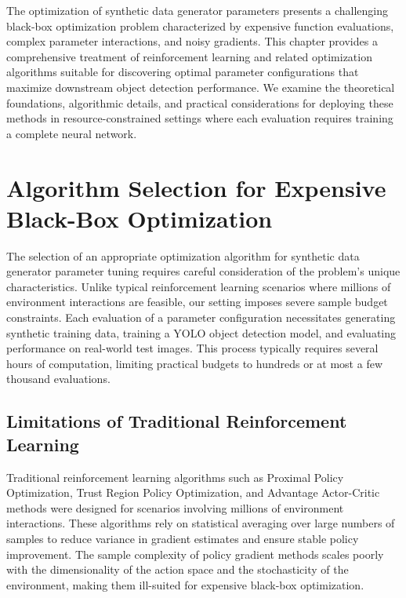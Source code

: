 

The optimization of synthetic data generator parameters presents a challenging black-box optimization problem characterized by expensive function evaluations, complex parameter interactions, and noisy gradients. This chapter provides a comprehensive treatment of reinforcement learning and related optimization algorithms suitable for discovering optimal parameter configurations that maximize downstream object detection performance. We examine the theoretical foundations, algorithmic details, and practical considerations for deploying these methods in resource-constrained settings where each evaluation requires training a complete neural network.

\section{Algorithm Selection for Expensive Black-Box Optimization}
\label{sec:algorithm_selection}

The selection of an appropriate optimization algorithm for synthetic data generator parameter tuning requires careful consideration of the problem's unique characteristics. Unlike typical reinforcement learning scenarios where millions of environment interactions are feasible, our setting imposes severe sample budget constraints. Each evaluation of a parameter configuration necessitates generating synthetic training data, training a YOLO object detection model, and evaluating performance on real-world test images. This process typically requires several hours of computation, limiting practical budgets to hundreds or at most a few thousand evaluations.

\subsection{Limitations of Traditional Reinforcement Learning}
\label{subsec:rl_limitations}

Traditional reinforcement learning algorithms such as Proximal Policy Optimization, Trust Region Policy Optimization, and Advantage Actor-Critic methods were designed for scenarios involving millions of environment interactions. These algorithms rely on statistical averaging over large numbers of samples to reduce variance in gradient estimates and ensure stable policy improvement. The sample complexity of policy gradient methods scales poorly with the dimensionality of the action space and the stochasticity of the environment, making them ill-suited for expensive black-box optimization.

